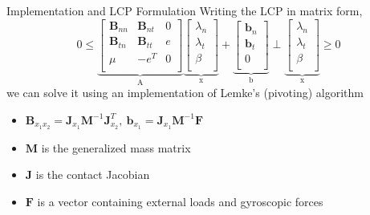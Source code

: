 \begin{frame}{Implementation and LCP Formulation \cite{ErlebenK}}
Writing the LCP in matrix form,
    \[
        0 \leq
        \underbrace{
        \left [
        \begin{array}{ccc}
             \textbf{B}_{nn} & \textbf{B}_{nt} & 0 \\
             \textbf{B}_{tn} & \textbf{B}_{tt} & e \\
             \mu & -e^T & 0 \\
        \end{array}
        \right ]
        }_{\text{A}}
        \underbrace{
        \left [
        \begin{array}{c}
            \lambda_n \\
            \lambda_t \\
            \beta   \\
        \end{array}
        \right ]
        }_\text{x}
        + \underbrace{\left [
        \begin{array}{c}
            \textbf{b}_n \\
            \textbf{b}_t \\
            0   \\
        \end{array}
        \right ] }_\text{b}
        \perp 
        \underbrace{\left [
        \begin{array}{c}
            \lambda_n \\
            \lambda_t \\
            \beta   \\
        \end{array}
        \right ]}_\text{x}
        \geq 0
    \]
    we can solve it using an implementation of Lemke's (pivoting) algorithm\\
    \begin{itemize}
        \item $\textbf{B}_{x_1x_2} = \textbf{J}_{x_1} \textbf{M}^{-1} \textbf{J}_{x_2}^T,\ \textbf{b}_{x_1} = \textbf{J}_{x_1} \textbf{M}^{-1} \textbf{F} $
        \item $\textbf{M}$ is the generalized mass matrix
        \item $\textbf{J}$ is the contact Jacobian
        \item $\textbf{F}$ is a vector containing external loads and gyroscopic forces
    \end{itemize}
\end{frame}


